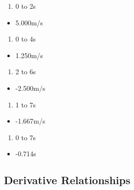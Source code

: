 \documentclass[
  letterpaper,
  DIV=11,
  numbers=noendperiod]{scrartcl}
\providecommand{\tightlist}{%
  \setlength{\itemsep}{0pt}\setlength{\parskip}{0pt}}\usepackage{longtable,booktabs,array}
\begin{document}
\begin{enumerate}
\def\labelenumi{(\alph{enumi})}
\tightlist
\item
  0 to 2s
\end{enumerate}

\begin{itemize}
\tightlist
\item
  5.000m/s
\end{itemize}

\begin{enumerate}
\def\labelenumi{(\alph{enumi})}
\setcounter{enumi}{1}
\tightlist
\item
  0 to 4s
\end{enumerate}

\begin{itemize}
\tightlist
\item
  1.250m/s
\end{itemize}

\begin{enumerate}
\def\labelenumi{(\alph{enumi})}
\setcounter{enumi}{2}
\tightlist
\item
  2 to 6s
\end{enumerate}

\begin{itemize}
\tightlist
\item
  -2.500m/s
\end{itemize}

\begin{enumerate}
\def\labelenumi{(\alph{enumi})}
\setcounter{enumi}{3}
\tightlist
\item
  1 to 7s
\end{enumerate}

\begin{itemize}
\tightlist
\item
  -1.667m/s
\end{itemize}

\begin{enumerate}
\def\labelenumi{(\alph{enumi})}
\setcounter{enumi}{4}
\tightlist
\item
  0 to 7s
\end{enumerate}

\begin{itemize}
\tightlist
\item
  -0.714s
\end{itemize}

\hypertarget{derivative-relationships}{%
\subsection{Derivative Relationships}\label{derivative-relationships}}
\end{document}
